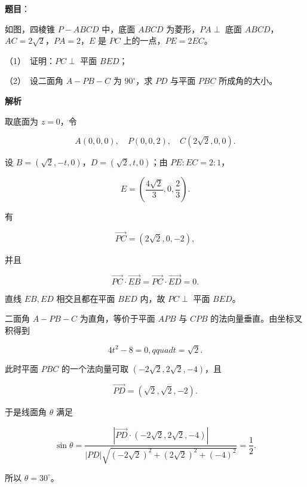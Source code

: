 \begin{answer}

\textbf{题目}：

如图，四棱锥 $P-ABCD$ 中，底面 $ABCD$ 为菱形，$PA\perp$ 底面 $ABCD$，$AC=2\sqrt2$，$PA=2$，$E$ 是 $PC$ 上的一点，$PE=2EC$。
\nopagebreak[4]
\begin{center}\end{center}
\nopagebreak[4]
（1）　证明：$PC\perp$ 平面 $BED$；

（2）　设二面角 $A-PB-C$ 为 $90^\circ$，求 $PD$ 与平面 $PBC$ 所成角的大小。

\textbf{解析}

取底面为 $z=0$，令

\nopagebreak[4]
\[
A(0,0,0),\quad P(0,0,2),\quad C(2\sqrt2,0,0).
\]

设 $B=(\sqrt2,-t,0)$，$D=(\sqrt2,t,0)$；由 $PE:EC=2:1$，

\nopagebreak[4]
\[
E=\left(\frac{4\sqrt2}{3},0,\frac23\right).
\]


有

\nopagebreak[4]
\[
\overrightarrow{PC}=(2\sqrt2,0,-2),
\]

并且

\nopagebreak[4]
\[
\overrightarrow{PC}\cdot\overrightarrow{EB}
=\overrightarrow{PC}\cdot\overrightarrow{ED}=0.
\]

直线 $EB,ED$ 相交且都在平面 $BED$ 内，故 $PC\perp$ 平面 $BED$。


二面角 $A-PB-C$ 为直角，等价于平面 $APB$ 与 $CPB$ 的法向量垂直。由坐标叉积得到

\nopagebreak[4]
\[
4t^2-8=0,qquad t=\sqrt2.
\]

此时平面 $PBC$ 的一个法向量可取 $(-2\sqrt2,2\sqrt2,-4)$，且

\nopagebreak[4]
\[
\overrightarrow{PD}=(\sqrt2,\sqrt2,-2).
\]

于是线面角 $\theta$ 满足

\nopagebreak[4]
\[
\sin\theta=
\frac{|\overrightarrow{PD}\cdot(-2\sqrt2,2\sqrt2,-4)|}
{|PD|\sqrt{(-2\sqrt2)^2+(2\sqrt2)^2+(-4)^2}}
=\frac12.
\]

所以 $\theta=30^\circ$。



\end{answer}
